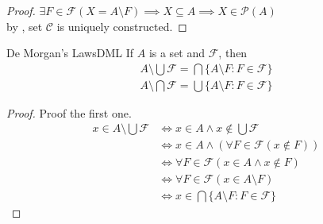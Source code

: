 \begin{proof}
    $\exists F \in \mathcal{F}(X = A \setminus F) \implies X \subseteq
    A \implies X \in \mathcal{P}(A)$\\
    by , set $\mathcal{C}$ is uniquely constructed.

\end{proof}

\begin{theorem}{De Morgan's Laws}{DML}
    If $A$ is a set and $\mathcal{F}$, then
    \begin{eqnarray*}
        A \setminus \bigcup \mathcal{F} = \bigcap \{A \setminus F: F \in
        \mathcal{F}\}\\
        A \setminus \bigcap \mathcal{F} = \bigcup \{A \setminus F: F \in
        \mathcal{F}\}
    \end{eqnarray*}
\end{theorem}

\begin{proof}
    Proof the first one.\\
    \begin{align*}
        x \in A \setminus \bigcup \mathcal{F} &\iff x \in A \land x
        \notin \bigcup \mathcal{F}\\
        &\iff x \in A \land (\forall F \in \mathcal{F}(x \notin F)) \\
        &\iff \forall F \in \mathcal{F}(x \in A \land x \notin F)\\
        &\iff \forall F \in \mathcal{F}(x \in A \setminus F)\\
        &\iff x \in \bigcap \{A \setminus F : F \in \mathcal{F}\}
    \end{align*}
\end{proof}
